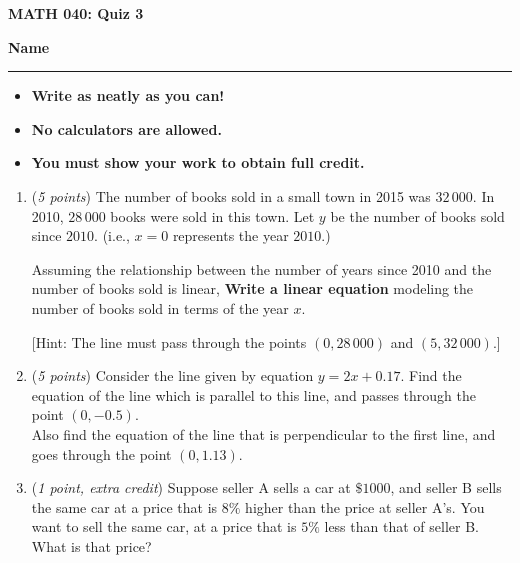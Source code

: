 \documentclass[12 pt]{article}
\begin{document}
  \begin{center}
    \textbf{\hfill MATH 040: Quiz 3} \\
  \end{center}
  \medskip

  \noindent
  \textbf{Name}\ \rule{3.5in}{.4pt} \hfill
  \vspace{.1in}
  \hspace*{0.2in}
  \begin{itemize}
    \item \textbf{Write as neatly as you can!}
    \item \textbf{No calculators are allowed.}
    \item \textbf{You must show your work to obtain full credit.}
  \end{itemize}

	\medskip
  \noindent

  \begin{enumerate}
    \item (\textit{5 points})
    The number of books sold in a small town in 2015 was $32\,000$. In 2010,
    $28\,000$ books were sold in this town. Let $y$ be the number of books sold since $2010$. (i.e., $x=0$ represents the year $2010$.)

    Assuming the relationship between the number of years since 2010 and the
    number of books sold is linear, \textbf{Write a linear equation} modeling
    the number of books sold in terms of the year $x$.

    [Hint: The line must pass through the points $(0, 28\,000)$ and $(5, 32\,000)$.] \\

		\pagebreak
		\item (\textit{5 points})
    Consider the line given by equation $y = 2x + 0.17$. Find the equation of
    the line which is parallel to this line, and passes through the point
    $(0, -0.5)$.
	  \\
	   Also find the equation of the line that is perpendicular to the first line,
     and goes through the point $(0, 1.13)$.
    \vspace{3in}\\
    \item (\textit{1 point, extra credit})
    Suppose seller A sells a car at $\$1000$, and seller B sells the same car
    at a price that is $8\%$ higher than the price at seller A's.
    You want to sell the same car, at a price that is $5\%$ less than that of
    seller B. What is that price?
  \end{enumerate}
\end{document}
